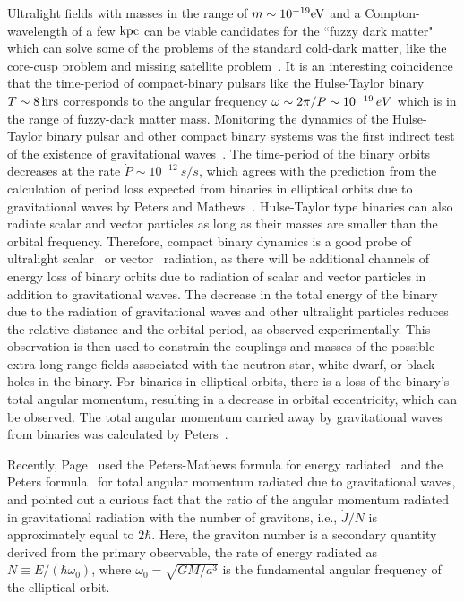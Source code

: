 \documentclass[aps,prd]{revtex4-2}
\begin{document}
Ultralight fields with masses in the range of $m\sim 10^{-19} {\rm eV}$ and a Compton-wavelength of a few ${\rm kpc}$ can be viable candidates for the ``fuzzy dark matter"~\cite{Hu:2000ke, Hui:2016ltb} which can solve some of the problems of the standard cold-dark matter, like the core-cusp problem and missing satellite problem~\cite{Schive:2025bcm}. It is an interesting coincidence that the time-period of compact-binary pulsars like the Hulse-Taylor binary~\cite{Hulse:1974eb}  $T\sim 8\, {\rm hrs}$ corresponds to the angular frequency $\omega\sim 2\pi/P\sim 10^{-19} \,{\rm }eV$ which is in the range of fuzzy-dark matter mass. Monitoring the dynamics of the Hulse-Taylor binary pulsar and other compact binary systems was the first indirect test of the existence of gravitational waves~\cite{Weisberg:2010zz}. The time-period of the binary orbits decreases at the rate $\dot{P} \sim 10^{-12} ~s/s$, which agrees with the prediction from the calculation of period loss expected from binaries in elliptical orbits due to gravitational waves by Peters and Mathews~\cite{Peters:1963ux}. Hulse-Taylor type binaries can also radiate scalar and vector particles as long as their masses are smaller than the orbital frequency. Therefore, compact binary dynamics is a good probe of ultralight scalar~\cite{Mohanty:1994yi, KumarPoddar:2019jxe, Poddar:2023pfj}  or vector~\cite{KumarPoddar:2019ceq} radiation, as there will be additional channels of energy loss of binary orbits due to radiation of scalar and vector particles in addition to gravitational waves. The decrease in the total energy of the binary due to the radiation of gravitational waves and other ultralight particles reduces the relative distance and the orbital period, as observed experimentally. This observation is then used to constrain the couplings and masses of the possible extra long-range fields associated with the neutron star, white dwarf, or black holes in the binary. For binaries in elliptical orbits, there is a loss of the binary's total angular momentum, resulting in a decrease in orbital eccentricity, which can be observed. The total angular momentum carried away by gravitational waves from binaries was calculated by Peters~\cite{Peters:1964zz}. 

Recently, Page~\cite{Page:2025ncu} used the Peters-Mathews formula for energy radiated~\cite{Peters:1963ux} and the Peters formula~\cite{Peters:1964zz} for total angular momentum radiated due to gravitational waves, and pointed out a curious fact that the ratio of the angular momentum radiated in gravitational radiation with the number of gravitons, i.e., $\dot{J}/\dot{N}$ is approximately equal to $2\hbar$. Here, the graviton number is a secondary quantity derived from the primary observable, the rate of energy radiated as $\dot{N} \equiv \dot{E}/ (\hbar \omega_0)$, where $\omega_0= \sqrt{GM/a^3}$ is the fundamental angular frequency of the elliptical orbit. 
 
\end{document}
